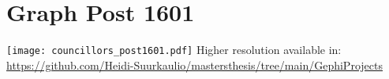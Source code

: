 \section{Graph Post 1601}
\texttt{[image: councillors\_post1601.pdf]}
Higher resolution available in: \url{https://github.com/Heidi-Suurkaulio/mastersthesis/tree/main/GephiProjects}
